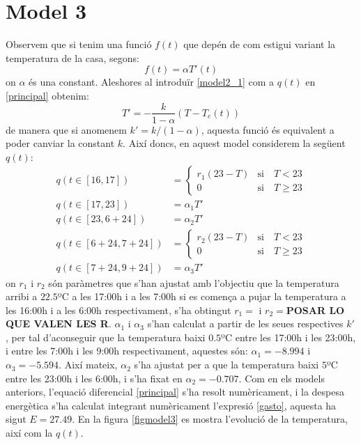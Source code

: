 \documentclass[11pt]{article}
\begin{document}
	\section{Model 3}
	Observem que si tenim una funció $f(t)$ que depén de com estigui variant la temperatura de la casa, segons:
	\begin{equation}\label{model2_1}
		f(t)=\alpha T'(t)
	\end{equation}
	on $\alpha$ és una constant. Aleshores al introduïr \eqref{model2_1} com a $q(t)$ en \eqref{principal} obtenim:
	\begin{equation}
		T'=-\frac{k}{1-\alpha}(T-T_e(t))
	\end{equation}
	de manera que si anomenem $k'=k/(1-\alpha)$, aquesta funció és equivalent a poder canviar la constant $k$. Així doncs, en aquest model considerem la següent $q(t)$:
	\begin{align} 
	q(t\in[16,17])&=
	\begin{cases}
	r_1(23-T)&\text{si}\quad T<23\\
	0&\text{si}\quad T\geq23
	\end{cases}
	\\
	q(t\in[17,23])&=\alpha_1T'\\
	q(t\in[23,6+24])&=\alpha_2T'\\
	q(t\in[6+24,7+24])&=
	\begin{cases}
	r_2(23-T)&\text{si}\quad T<23\\
	0&\text{si}\quad T\geq23
	\end{cases}
	\\
	q(t\in[7+24,9+24])&=\alpha_3T'
	\end{align}
	on $r_1$ i $r_2$ són paràmetres que s'han ajustat amb l'objectiu que la temperatura arribi a $22.5$ºC a les 17:00h i a les 7:00h si es comença a pujar la temperatura a les 16:00h i a les 6:00h respectivament, s'ha obtingut $r_1=$ i $r_2=$\textbf{POSAR LO QUE VALEN LES R}. $\alpha_1$ i $\alpha_3$ s'han calculat a partir de les seues respectives $k'$, per tal d'aconseguir que la temperatura baixi $0.5$ºC entre les 17:00h i les 23:00h, i entre les 7:00h i les 9:00h respectivament, aquestes són: $\alpha_1=-8.994$ i $\alpha_3=-5.594$. Així mateix, $\alpha_2$ s'ha ajustat per a que la temperatura baixi $5$ºC entre les 23:00h i les 6:00h, i s'ha fixat en $\alpha_2=-0.707$. Com en els models anteriors, l'equació diferencial \eqref{principal} s'ha resolt numèricament, i la despesa energètica s'ha calculat integrant numèricament l'expresió \eqref{gasto}, aquesta ha sigut $E=27.49$. En la figura \ref{figmodel3} es mostra l'evolució de la temperatura, així com la $q(t)$.\\
\end{document}
